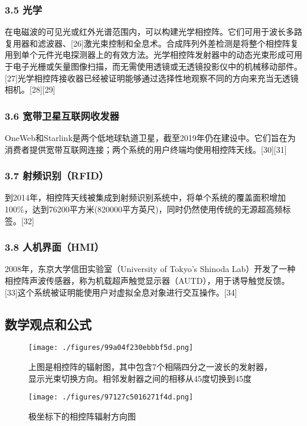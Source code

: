 \subsubsection{3.5 光学}
在电磁波的可见光或红外光谱范围内，可以构建光学相控阵。它们可用于波长多路复用器和滤波器、[26]激光束控制和全息术。合成阵列外差检测是将整个相控阵复用到单个元件光电探测器上的有效方法。光学相控阵发射器中的动态光束形成可用于电子光栅或矢量图像扫描，而无需使用透镜或无透镜投影仪中的机械移动部件。[27]光学相控阵接收器已经被证明能够通过选择性地观察不同的方向来充当无透镜相机。[28][29]

\subsubsection{3.6 宽带卫星互联网收发器}
OneWeb和Starlink是两个低地球轨道卫星，截至2019年仍在建设中。它们旨在为消费者提供宽带互联网连接；两个系统的用户终端均使用相控阵天线。[30][31]

\subsubsection{3.7 射频识别（RFID）}
到2014年，相控阵天线被集成到射频识别系统中，将单个系统的覆盖面积增加100\%，达到76200平方米(820000平方英尺)，同时仍然使用传统的无源超高频标签。[32]

\subsubsection{3.8 人机界面（HMI）}
2008年，东京大学信田实验室（University of Tokyo's Shinoda Lab）开发了一种相控阵声波传感器，称为机载超声触觉显示器（AUTD），用于诱导触觉反馈。[33]这个系统被证明能使用户对虚拟全息对象进行交互操作。[34]

\subsection{数学观点和公式}
\begin{figure}[ht]
\centering
\texttt{[image: ./figures/99a04f230ebbbf5d.png]}
\caption{上图是相控阵的辐射图，其中包含7个相隔四分之一波长的发射器，显示光束切换方向。相邻发射器之间的相移从45度切换到45度} \label{fig_XKZ_10}
\end{figure}
\begin{figure}[ht]
\centering
\texttt{[image: ./figures/97127c5016271f4d.png]}
\caption{极坐标下的相控阵辐射方向图} \label{fig_XKZ_11}
\end{figure}

